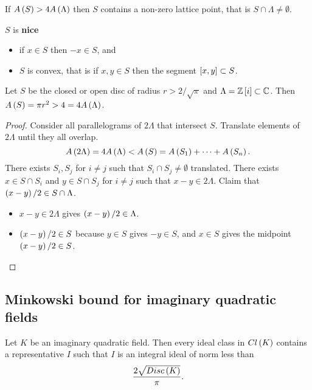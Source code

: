 \begin{theorem}
If $ A\rb{S} > 4A\rb{\Lambda} $ then $ S $ contains a non-zero lattice point, that is $ S \cap \Lambda \ne \emptyset $.
\end{theorem}

$ S $ is \textbf{nice}
\begin{itemize}
\item if $ x \in S $ then $ -x \in S $, and
\item $ S $ is convex, that is if $ x, y \in S $ then the segment $ \sb{x, y} \subset S $.
\end{itemize}

\begin{example*}
Let $ S $ be the closed or open disc of radius $ r > 2 / \sqrt{\pi} $ and $ \Lambda = \Z\sb{i} \subset \C $. Then $ A\rb{S} = \pi r^2 > 4 = 4A\rb{\Lambda} $.
\end{example*}

\begin{proof}
Consider all parallelograms of $ 2\Lambda $ that intersect $ S $. Translate elements of $ 2\Lambda $ until they all overlap.
$$ A\rb{2\Lambda} = 4A\rb{\Lambda} < A\rb{S} = A\rb{S_1} + \dots + A\rb{S_n}. $$
There exists $ S_i, S_j $ for $ i \ne j $ such that $ S_i \cap S_j \ne \emptyset $ translated. There exists $ x \in S \cap S_i $ and $ y \in S \cap S_j $ for $ i \ne j $ such that $ x - y \in 2\Lambda $. Claim that $ \rb{x - y} / 2 \in S \cap \Lambda $.
\begin{itemize}
\item $ x - y \in 2\Lambda $ gives $ \rb{x - y} / 2 \in \Lambda $.
\item $ \rb{x - y} / 2 \in S $ because $ y \in S $ gives $ -y \in S $, and $ x \in S $ gives the midpoint $ \rb{x - y} / 2 \in S $.
\end{itemize}
\end{proof}

\pagebreak

\subsection{Minkowski bound for imaginary quadratic fields}

\begin{theorem}
Let $ K $ be an imaginary quadratic field. Then every ideal class in $ Cl\rb{K} $ contains a representative $ I $ such that $ I $ is an integral ideal of norm less than
$$ \dfrac{2\sqrt{Disc\rb{K}}}{\pi}. $$
\end{theorem}

